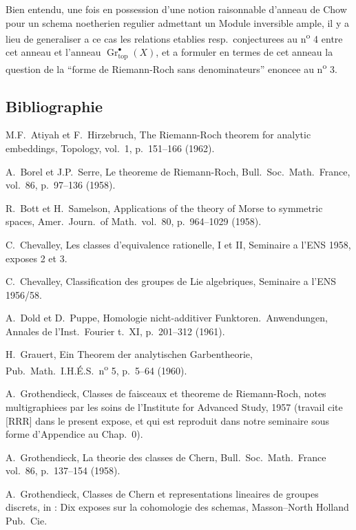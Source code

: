 Bien entendu, une fois en possession d'une notion raisonnable d'anneau de Chow pour un schema noetherien regulier admettant un Module inversible ample, il y a lieu de generaliser a ce cas les relations etablies resp.\ conjecturees au n\textsuperscript{o} 4 entre cet anneau et l'anneau $\operatorname{Gr}_{\mathrm{top}}^{\bullet}(X)$, et a formuler en termes de cet anneau la question de la ``forme de Riemann-Roch sans denominateurs'' enoncee au n\textsuperscript{o} 3.

\subsection*{Bibliographie}

\begin{enumerate}[label={[\arabic*]}]
\item[{[1]}] M.F.\ Atiyah et F.\ Hirzebruch, The Riemann-Roch theorem for analytic embeddings, Topology, vol.\ 1, p.\ 151--166 (1962).
\item[{[2]}] A.\ Borel et J.P.\ Serre, Le theoreme de Riemann-Roch, Bull.\ Soc.\ Math.\ France, vol.\ 86, p.\ 97--136 (1958).
\item[{[3]}] R.\ Bott et H.\ Samelson, Applications of the theory of Morse to symmetric spaces, Amer.\ Journ.\ of Math.\ vol.\ 80, p.\ 964--1029 (1958).
\item[{[4]}] C.\ Chevalley, Les classes d'equivalence rationelle, I et II, Seminaire a l'ENS 1958, exposes 2 et 3.
\item[{[5]}] C.\ Chevalley, Classification des groupes de Lie algebriques, Seminaire a l'ENS 1956/58.
\item[{[6]}] A.\ Dold et D.\ Puppe, Homologie nicht-additiver Funktoren.\ Anwendungen, Annales de l'Inst.\ Fourier t.\ XI, p.\ 201--312 (1961).
\item[{[7]}] H.\ Grauert, Ein Theorem der analytischen Garbentheorie, Pub.\ Math.\ I.H.\'E.S.\ n\textsuperscript{o} 5, p.\ 5--64 (1960).
\item[{[8]}] A.\ Grothendieck, Classes de faisceaux et theoreme de Riemann-Roch, notes multigraphiees par les soins de l'Institute for Advanced Study, 1957 (travail cite [RRR] dans le present expose, et qui est reproduit dans notre seminaire sous forme d'Appendice au Chap.\ 0).
\item[{[9]}] A.\ Grothendieck, La theorie des classes de Chern, Bull.\ Soc.\ Math.\ France vol.\ 86, p.\ 137--154 (1958).
\item[{[10]}] A.\ Grothendieck, Classes de Chern et representations lineaires de groupes discrets, in : Dix exposes sur la cohomologie des schemas, Masson--North Holland Pub.\ Cie.

\end{enumerate}
